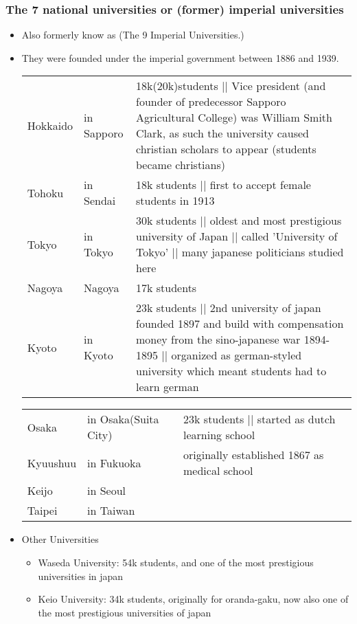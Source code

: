 \documentclass{article}
\begin{document}
\subsubsection{ The 7 national universities or (former) imperial universities }
\begin{itemize}
\item Also formerly know as  (The 9 Imperial Universities.)
\item They were founded under the imperial government between 1886 and 1939. \\%
\begin{tabular}{ l l p{14cm} }
Hokkaido &in Sapporo & 18k(20k)students || Vice president  (and founder of predecessor Sapporo Agricultural College) was William Smith Clark, as such the university caused christian scholars to appear (students became christians)\\
Tohoku &in Sendai& 18k students || first to accept female students in 1913\\
Tokyo &in Tokyo& 30k students || oldest and most prestigious university of Japan || called 'University of Tokyo' || many japanese politicians studied here \\
Nagoya &Nagoya& 17k students\\
Kyoto &in Kyoto& 23k students || 2nd university of japan founded 1897 and build with compensation money from the sino-japanese war 1894-1895 || organized as german-styled university which meant students had to learn german\\
\end{tabular}
\begin{tabular}{ l l p{14cm} }
Osaka &in Osaka(Suita City)& 23k students || started as dutch learning school\\
Kyuushuu &in Fukuoka& originally established 1867 as medical school\\
Keijo &in Seoul& \\
Taipei &in Taiwan & \\
\end{tabular}
\item Other Universities
\begin{itemize}
\item Waseda University: 54k students, and one of the most prestigious universities in japan
\item Keio University: 34k students, originally for oranda-gaku, now also one of the most prestigious universities of japan

\end{itemize}
\end{itemize}
\end{document}
